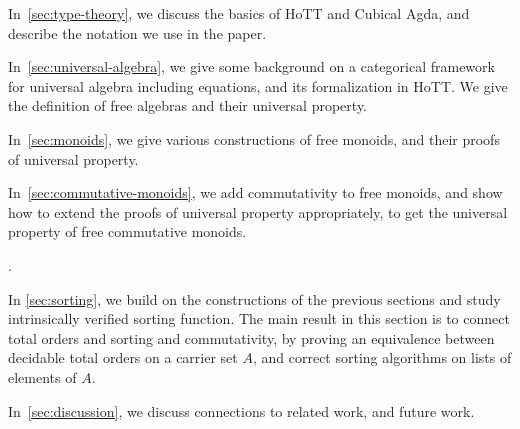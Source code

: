 \begin{myitemize}
    \item In~\cref{sec:type-theory}, we discuss the basics of HoTT and Cubical Agda, and describe the notation we use in the paper.
    \item In~\cref{sec:universal-algebra}, we give some background on a categorical framework for universal algebra including equations, and its formalization in HoTT. We give the definition of free algebras and their universal property. 
    \item In~\cref{sec:monoids}, we give various constructions of free monoids, and their proofs of universal property.
    \item In~\cref{sec:commutative-monoids}, we add commutativity to free monoids, and show how to extend the proofs of universal property appropriately, to get the universal property of free commutative monoids.
    \item {}.
    \item In \cref{sec:sorting}, we build on the constructions of the previous sections and study intrinsically verified sorting function. The main result in this section is to connect total orders and sorting and commutativity, by proving an equivalence between decidable total orders on a carrier set $A$, and correct sorting algorithms on lists of elements of $A$.
    \item In~\cref{sec:discussion}, we discuss connections to related work, and future work.
\end{myitemize}

